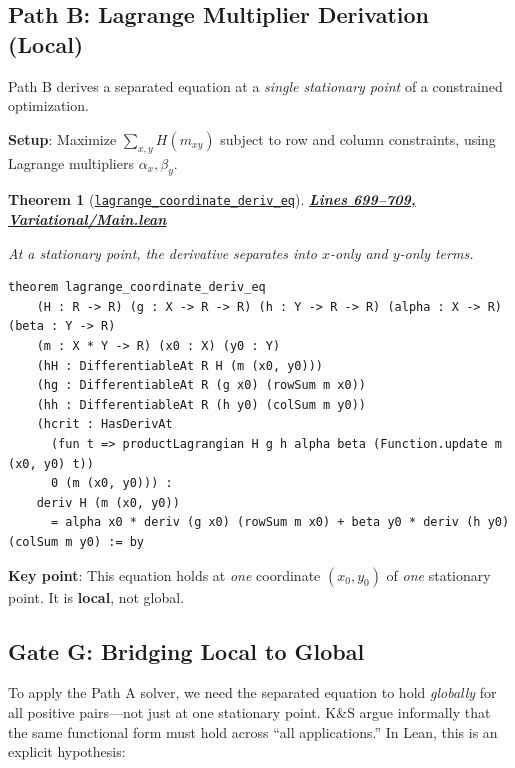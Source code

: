\documentclass[11pt]{article}
\newtheorem{theorem}{Theorem}[section]
\theoremstyle{definition}
\theoremstyle{remark}
\begin{document}
\subsection{Path B: Lagrange Multiplier Derivation (Local)}
\label{subsec:var-pathB}

Path B derives a separated equation at a \emph{single stationary point} of a constrained optimization.

\textbf{Setup}: Maximize $\sum_{x,y} H(m_{xy})$ subject to row and column constraints, using Lagrange multipliers $\alpha_x, \beta_y$.

\begin{theorem}[\href{https://github.com/zariuq/ks-foundations-of-inference/blob/main/KnuthSkilling/Variational/Main.lean\#L699}{\texttt{lagrange\_coordinate\_deriv\_eq}}]
\textbf{\href{https://github.com/zariuq/ks-foundations-of-inference/blob/main/KnuthSkilling/Variational/Main.lean\#L699-L709}{Lines 699--709, Variational/Main.lean}}

At a stationary point, the derivative separates into $x$-only and $y$-only terms.
\end{theorem}

\begin{lstlisting}[caption={Path B: local separated equation at stationary point},firstnumber=699]
theorem lagrange_coordinate_deriv_eq
    (H : R -> R) (g : X -> R -> R) (h : Y -> R -> R) (alpha : X -> R) (beta : Y -> R)
    (m : X * Y -> R) (x0 : X) (y0 : Y)
    (hH : DifferentiableAt R H (m (x0, y0)))
    (hg : DifferentiableAt R (g x0) (rowSum m x0))
    (hh : DifferentiableAt R (h y0) (colSum m y0))
    (hcrit : HasDerivAt
      (fun t => productLagrangian H g h alpha beta (Function.update m (x0, y0) t))
      0 (m (x0, y0))) :
    deriv H (m (x0, y0))
      = alpha x0 * deriv (g x0) (rowSum m x0) + beta y0 * deriv (h y0) (colSum m y0) := by
\end{lstlisting}

\textbf{Key point}: This equation holds at \emph{one} coordinate $(x_0, y_0)$ of \emph{one} stationary point. It is \textbf{local}, not global.

\subsection{Gate G: Bridging Local to Global}
\label{subsec:var-gateG}

To apply the Path A solver, we need the separated equation to hold \emph{globally} for all positive pairs---not just at one stationary point. K\&S argue informally that the same functional form must hold across ``all applications.'' In Lean, this is an explicit hypothesis:
\end{document}
